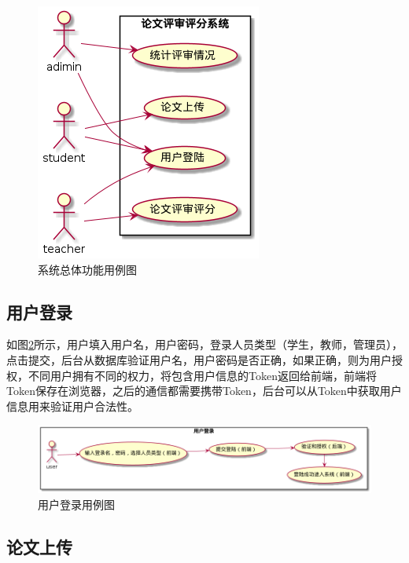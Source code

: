 \begin{figure}[htbp]
      \centering
      \includegraphics[scale = 0.73]{out/uml/用例图/系统总体功能用例图/系统总体功能用例图.png}
      \caption{\song\wuhao 系统总体功能用例图}
      \label{system-usecase}
\end{figure}

\subsection{用户登录}

如图\ref{login-usecase}所示，用户填入用户名，用户密码，登录人员类型（学生，教师，管理员），点击提交，后台从数据库验证用户名，用户密码是否正确，如果正确，则为用户授权，不同用户拥有不同的权力，将包含用户信息的Token返回给前端，前端将Token保存在浏览器，之后的通信都需要携带Token，后台可以从Token中获取用户信息用来验证用户合法性。

\begin{figure}[htbp]
      \centering
      \includegraphics[scale = 0.49]{out/uml/用例图/1-用户登录用例图/1-用户登录用例图.png}
      \caption{\song\wuhao 用户登录用例图}
      \label{login-usecase}
\end{figure}

\subsection{论文上传}

